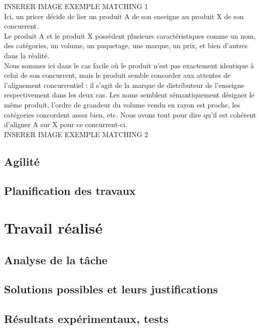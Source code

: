 \documentclass{rapportCS}
\begin{document}
INSERER IMAGE EXEMPLE MATCHING 1\\

Ici, un pricer décide de lier un produit A de son enseigne au produit X de son concurrent.\\
Le produit A et le produit X possèdent plusieurs caractéristiques comme un nom, des catégories, un volume,
un paquetage, une marque, un prix, et bien d'autres dans la réalité.\\
Nous sommes ici dans le cas facile où le produit n'est pas exactement identique à celui de son concurrent,
mais le produit semble concorder aux attentes de l'alignement concurrentiel : il s'agit de la marque de distributeur
de l'enseigne respectivement dans les deux cas.
Les noms semblent sémantiquement désigner le même produit, l'ordre de grandeur du volume vendu en rayon est proche,
les catégories concordent assez bien, etc.
Nous avons tout pour dire qu'il est cohérent d'aligner A sur X pour ce concurrent-ci. \\

INSERER IMAGE EXEMPLE MATCHING 2\\

\subsection{Agilité}
\subsection{Planification des travaux}

\newpage
\section{Travail réalisé}
\subsection{Analyse de la tâche}

\subsection{Solutions possibles et leurs justifications}
\subsection{Résultats expérimentaux, tests}
\end{document}

